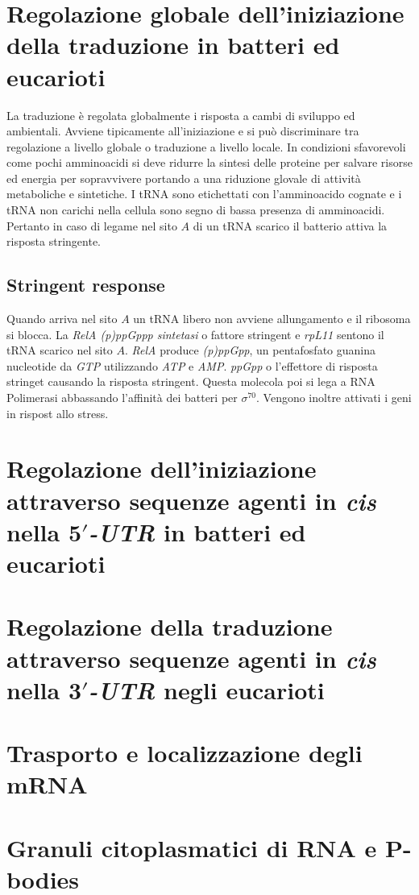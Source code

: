 \section{Regolazione globale dell'iniziazione della traduzione in batteri ed eucarioti}
La traduzione \`e regolata globalmente i risposta a cambi di sviluppo ed ambientali. Avviene tipicamente all'iniziazione e si pu\`o discriminare tra regolazione a livello globale o 
traduzione a livello locale. In condizioni sfavorevoli come pochi amminoacidi si deve ridurre la sintesi delle proteine per salvare risorse ed energia per sopravvivere portando
a una riduzione glovale di attivit\`a metaboliche e sintetiche. I tRNA sono etichettati con l'amminoacido cognate e i tRNA non carichi nella cellula sono segno di bassa presenza di 
amminoacidi. Pertanto in caso di legame nel sito $A$ di un tRNA scarico il batterio attiva la risposta stringente. 
\subsection{Stringent response}
Quando arriva nel sito $A$ un tRNA libero non avviene allungamento e il ribosoma si blocca. La \emph{RelA (p)ppGppp sintetasi} o fattore stringent e \emph{rpL11} sentono il 
tRNA scarico nel sito $A$. \emph{RelA} produce \emph{(p)ppGpp}, un pentafosfato guanina nucleotide da \emph{GTP} utilizzando \emph{ATP} e \emph{AMP}. \emph{ppGpp} o l'effettore di 
risposta stringet causando la risposta stringent. Questa molecola poi si lega a RNA Polimerasi abbassando l'affinit\`a dei batteri per $\sigma^{70}$. Vengono inoltre attivati i 
geni in rispost allo stress. 

\section{Regolazione dell'iniziazione attraverso sequenze agenti in \emph{cis} nella \emph{$\mathbf{5'}$-UTR} in batteri ed eucarioti}

\section{Regolazione della traduzione attraverso sequenze agenti in \emph{cis} nella \emph{$\mathbf{3'}$-UTR} negli eucarioti}

\section{Trasporto e localizzazione degli mRNA}

\section{Granuli citoplasmatici di RNA e P-bodies}
